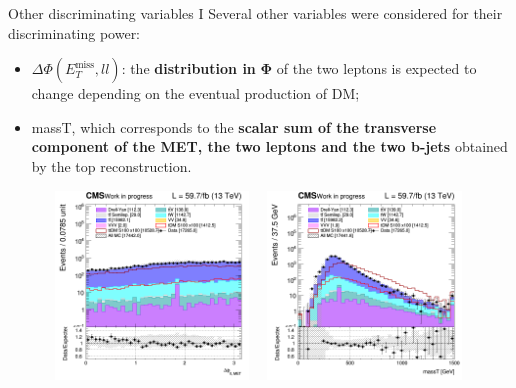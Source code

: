\documentclass[8pt]{beamer}
\begin{document}
\begin{frame}{Other discriminating variables I}
\justifying
Several other variables were considered for their discriminating power:
\begin{itemize}
\justifying
\item $\Delta \Phi(E_{T}^{\text{miss}}, ll)$: the \textbf{distribution in} $\bm{\Phi}$ of the two leptons is expected to change depending on the eventual production of DM;
\item massT, which corresponds to the \textbf{scalar sum of the transverse component of the MET, the two leptons and the two b-jets} obtained by the top reconstruction.
\end{itemize} \vfill

\begin{figure}[htbp]
\centering
\begin{minipage}[b]{.49\textwidth}
\includegraphics[width=5.5cm, height=5cm]{figs/2018/SmearSR-ttDM-scalar100/log_cratio_topCR_ll_dphillmet.png}
\end{minipage}\hfill
\begin{minipage}[b]{.49\textwidth}
\includegraphics[width=5.5cm, height=5cm]{figs/2018/SmearSR-ttDM-scalar100/log_cratio_topCR_ll_massT.png}
\end{minipage} \hfill
\end{figure} \vfill
\end{frame}
\end{document}
